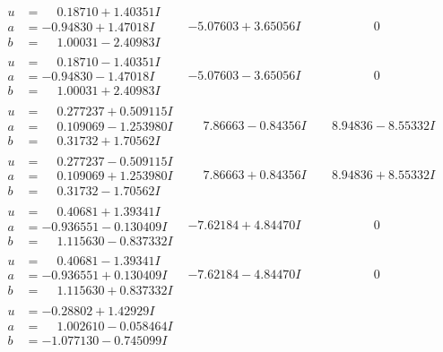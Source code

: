 \documentclass[1p]{elsarticle_modified}
\theoremstyle{definition}
\begin{document}
$$\begin{array}{c|c|c}
\begin{aligned}
u &= \phantom{-}0.18710 + 1.40351 I \\
a &= -0.94830 + 1.47018 I \\
b &= \phantom{-}1.00031 - 2.40983 I\end{aligned}
 & -5.07603 + 3.65056 I & \phantom{-0.000000 } 0 \\ \hline\begin{aligned}
u &= \phantom{-}0.18710 - 1.40351 I \\
a &= -0.94830 - 1.47018 I \\
b &= \phantom{-}1.00031 + 2.40983 I\end{aligned}
 & -5.07603 - 3.65056 I & \phantom{-0.000000 } 0 \\ \hline\begin{aligned}
u &= \phantom{-}0.277237 + 0.509115 I \\
a &= \phantom{-}0.109069 - 1.253980 I \\
b &= \phantom{-}0.31732 + 1.70562 I\end{aligned}
 & \phantom{-}7.86663 - 0.84356 I & \phantom{-}8.94836 - 8.55332 I \\ \hline\begin{aligned}
u &= \phantom{-}0.277237 - 0.509115 I \\
a &= \phantom{-}0.109069 + 1.253980 I \\
b &= \phantom{-}0.31732 - 1.70562 I\end{aligned}
 & \phantom{-}7.86663 + 0.84356 I & \phantom{-}8.94836 + 8.55332 I \\ \hline\begin{aligned}
u &= \phantom{-}0.40681 + 1.39341 I \\
a &= -0.936551 - 0.130409 I \\
b &= \phantom{-}1.115630 - 0.837332 I\end{aligned}
 & -7.62184 + 4.84470 I & \phantom{-0.000000 } 0 \\ \hline\begin{aligned}
u &= \phantom{-}0.40681 - 1.39341 I \\
a &= -0.936551 + 0.130409 I \\
b &= \phantom{-}1.115630 + 0.837332 I\end{aligned}
 & -7.62184 - 4.84470 I & \phantom{-0.000000 } 0 \\ \hline\begin{aligned}
u &= -0.28802 + 1.42929 I \\
a &= \phantom{-}1.002610 - 0.058464 I \\
b &= -1.077130 - 0.745099 I\end{aligned}

\end{array}$$
\end{document}
